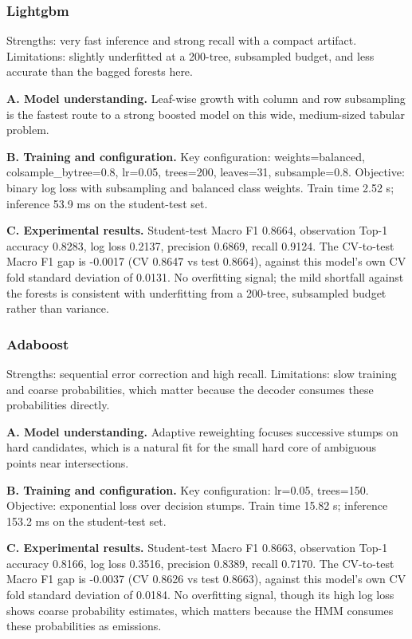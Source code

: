 \documentclass[11pt,a4paper]{article}
\begin{document}
\subsubsection{Lightgbm}

Strengths: very fast inference and strong recall with a compact artifact. Limitations: slightly underfitted at a 200-tree, subsampled budget, and less accurate than the bagged forests here.

\noindent\textbf{A. Model understanding.} Leaf-wise growth with column and row subsampling is the fastest route to a strong boosted model on this wide, medium-sized tabular problem.

\noindent\textbf{B. Training and configuration.} Key configuration: weights=balanced, colsample\_bytree=0.8, lr=0.05, trees=200, leaves=31, subsample=0.8. Objective: binary log loss with subsampling and balanced class weights. Train time 2.52 s; inference 53.9 ms on the student-test set.

\noindent\textbf{C. Experimental results.} Student-test Macro F1 0.8664, observation Top-1 accuracy 0.8283, log loss 0.2137, precision 0.6869, recall 0.9124. The CV-to-test Macro F1 gap is -0.0017 (CV 0.8647 vs test 0.8664), against this model's own CV fold standard deviation of 0.0131. No overfitting signal; the mild shortfall against the forests is consistent with underfitting from a 200-tree, subsampled budget rather than variance.

\subsubsection{Adaboost}

Strengths: sequential error correction and high recall. Limitations: slow training and coarse probabilities, which matter because the decoder consumes these probabilities directly.

\noindent\textbf{A. Model understanding.} Adaptive reweighting focuses successive stumps on hard candidates, which is a natural fit for the small hard core of ambiguous points near intersections.

\noindent\textbf{B. Training and configuration.} Key configuration: lr=0.05, trees=150. Objective: exponential loss over decision stumps. Train time 15.82 s; inference 153.2 ms on the student-test set.

\noindent\textbf{C. Experimental results.} Student-test Macro F1 0.8663, observation Top-1 accuracy 0.8166, log loss 0.3516, precision 0.8389, recall 0.7170. The CV-to-test Macro F1 gap is -0.0037 (CV 0.8626 vs test 0.8663), against this model's own CV fold standard deviation of 0.0184. No overfitting signal, though its high log loss shows coarse probability estimates, which matters because the HMM consumes these probabilities as emissions.
\end{document}
